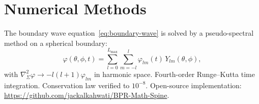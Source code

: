 \documentclass[12pt,oneside]{book}
\theoremstyle{definition}
\begin{document}
\section{Numerical Methods}

The boundary wave equation~\eqref{eq:boundary-wave} is solved by a pseudo-spectral
method on a spherical boundary:
\begin{equation}
  \varphi(\theta,\phi,t) = \sum_{l=0}^{L_{\max}}\sum_{m=-l}^{l}
  \varphi_{lm}(t)\,Y_{lm}(\theta,\phi),
\end{equation}
with $\nabla^2_\Sigma\varphi \to -l(l+1)\varphi_{lm}$ in harmonic space.
Fourth-order Runge--Kutta time integration. Conservation law verified to $10^{-8}$.
Open-source implementation: \url{https://github.com/jackalkahwati/BPR-Math-Spine}.

\end{document}
